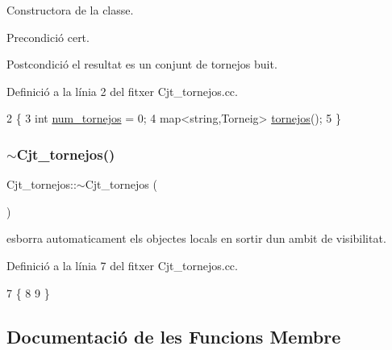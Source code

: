 Constructora de la classe. 

\begin{DoxyPrecond}{Precondició}
cert. 
\end{DoxyPrecond}
\begin{DoxyPostcond}{Postcondició}
el resultat es un conjunt de tornejos buit. 
\end{DoxyPostcond}


Definició a la línia 2 del fitxer Cjt\+\_\+tornejos.\+cc.


\begin{DoxyCode}
2                            \{
3     \textcolor{keywordtype}{int} \mbox{\hyperlink{class_cjt__tornejos_afe968dc02bf4f83842c53c5a76182f2f}{num\_tornejos}} = 0;
4     map<string,Torneig> \mbox{\hyperlink{class_cjt__tornejos_a4b3d9bdd2ed133d76284fb510ebe9800}{tornejos}}();
5 \}
\end{DoxyCode}
\mbox{\label{class_cjt__tornejos_a0c3c68b4cc7c962a2b8d6f9efeb2a84e}} 
\subsubsection{\texorpdfstring{$\sim$\+Cjt\+\_\+tornejos()}{~Cjt\_tornejos()}}
{\footnotesize\ttfamily Cjt\+\_\+tornejos\+::$\sim$\+Cjt\+\_\+tornejos (\begin{DoxyParamCaption}{ }\end{DoxyParamCaption})}



esborra automaticament els objectes locals en sortir d\textquotesingle{}un ambit de visibilitat. 



Definició a la línia 7 del fitxer Cjt\+\_\+tornejos.\+cc.


\begin{DoxyCode}
7                             \{
8     
9 \}
\end{DoxyCode}


\subsection{Documentació de les Funcions Membre}
\mbox{\label{class_cjt__tornejos_acc9a50af4b8896eb4e3faebb495a2ac7}} 
